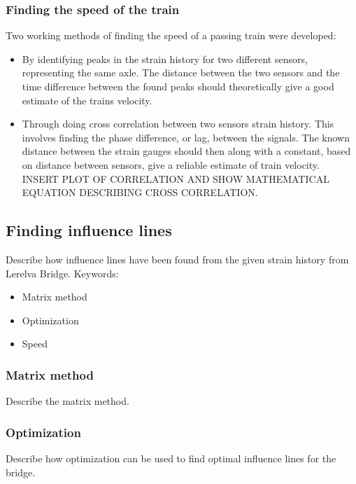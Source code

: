 \subsubsection{Finding the speed of the train}
Two working methods of finding the speed of a passing train were developed:
\begin{itemize}
 \item By identifying peaks in the strain history for two different sensors, representing the same axle. The distance between the two sensors and the time difference between the found peaks should theoretically give a good estimate of the trains velocity.
 \item Through doing cross correlation between two sensors strain history. This involves finding the phase difference, or lag, between the signals. The known distance between the strain gauges should then along with a constant, based on distance between sensors, give a reliable estimate of train velocity. INSERT PLOT OF CORRELATION AND SHOW MATHEMATICAL EQUATION DESCRIBING CROSS CORRELATION.
\end{itemize}

\subsection{Finding influence lines}
Describe how influence lines have been found from the given strain history from Lerelva Bridge.
Keywords:
\begin{itemize}
\item Matrix method
\item Optimization
\item Speed
\end{itemize}
\subsubsection{Matrix method}
Describe the matrix method.

\subsubsection{Optimization}
Describe how optimization can be used to find optimal influence lines for the bridge.

